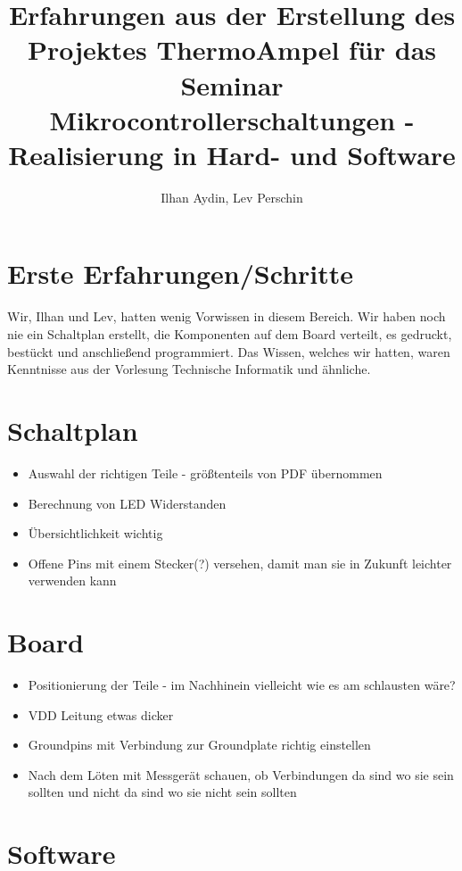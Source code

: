 \documentclass[]{article}
\title{Erfahrungen aus der Erstellung des Projektes \glqq ThermoAmpel\grqq{} für das Seminar \glqq Mikrocontrollerschaltungen - Realisierung in Hard- und Software\grqq}
\author{Ilhan Aydin, Lev Perschin}
\begin{document}
\maketitle
\newpage
\begin{abstract}

\end{abstract}
\newpage
\section{Erste Erfahrungen/Schritte}
Wir, Ilhan und Lev, hatten wenig Vorwissen in diesem Bereich. Wir haben noch nie ein Schaltplan erstellt, die Komponenten auf dem Board verteilt, es gedruckt, bestückt und anschließend programmiert. Das Wissen, welches wir hatten, waren Kenntnisse aus der Vorlesung \glqq Technische Informatik\grqq{} und ähnliche.


\section{Schaltplan}
\begin{itemize}
	\item Auswahl der richtigen Teile - größtenteils von PDF übernommen
	\item Berechnung von LED Widerstanden
	\item Übersichtlichkeit wichtig
	\item Offene Pins mit einem Stecker(?) versehen, damit man sie in Zukunft leichter verwenden kann
\end{itemize}
\section{Board}
\begin{itemize}
	\item Positionierung der Teile - im Nachhinein vielleicht wie es am schlausten wäre?
	\item VDD Leitung etwas dicker
	\item Groundpins mit Verbindung zur Groundplate richtig einstellen
	\item Nach dem Löten mit Messgerät schauen, ob Verbindungen da sind wo sie sein sollten und nicht da sind wo sie nicht sein sollten
\end{itemize}
\section{Software}
	
\end{document}

